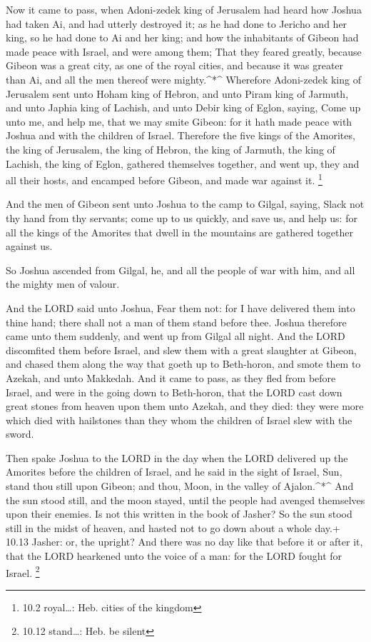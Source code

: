 Now it came to pass, when Adoni-zedek king of Jerusalem had
heard how Joshua had taken Ai, and had utterly destroyed it; as he had
done to Jericho and her king, so he had done to Ai and her king; and how
the inhabitants of Gibeon had made peace with Israel, and were among
them;  That they feared greatly, because Gibeon was a great
city, as one of the royal cities, and because it was greater than Ai,
and all the men thereof were mighty.\^{}*\^{}  Wherefore
Adoni-zedek king of Jerusalem sent unto Hoham king of Hebron, and unto
Piram king of Jarmuth, and unto Japhia king of Lachish, and unto Debir
king of Eglon, saying,  Come up unto me, and help me, that
we may smite Gibeon: for it hath made peace with Joshua and with the
children of Israel.  Therefore the five kings of the
Amorites, the king of Jerusalem, the king of Hebron, the king of
Jarmuth, the king of Lachish, the king of Eglon, gathered themselves
together, and went up, they and all their hosts, and encamped before
Gibeon, and made war against it. \footnote{10.2 royal\ldots: Heb. cities
  of the kingdom}

 And the men of Gibeon sent unto Joshua to the camp to
Gilgal, saying, Slack not thy hand from thy servants; come up to us
quickly, and save us, and help us: for all the kings of the Amorites
that dwell in the mountains are gathered together against us.

 So Joshua ascended from Gilgal, he, and all the people of
war with him, and all the mighty men of valour.

 And the LORD said unto Joshua, Fear them not: for I have
delivered them into thine hand; there shall not a man of them stand
before thee.  Joshua therefore came unto them suddenly, and
went up from Gilgal all night.  And the LORD discomfited
them before Israel, and slew them with a great slaughter at Gibeon, and
chased them along the way that goeth up to Beth-horon, and smote them to
Azekah, and unto Makkedah.  And it came to pass, as they
fled from before Israel, and were in the going down to Beth-horon, that
the LORD cast down great stones from heaven upon them unto Azekah, and
they died: they were more which died with hailstones than they whom the
children of Israel slew with the sword.

 Then spake Joshua to the LORD in the day when the LORD
delivered up the Amorites before the children of Israel, and he said in
the sight of Israel, Sun, stand thou still upon Gibeon; and thou, Moon,
in the valley of Ajalon.\^{}*\^{}  And the sun stood still,
and the moon stayed, until the people had avenged themselves upon their
enemies. Is not this written in the book of Jasher? So the sun stood
still in the midst of heaven, and hasted not to go down about a whole
day.+ 10.13 Jasher: or, the upright?  And there was no day
like that before it or after it, that the LORD hearkened unto the voice
of a man: for the LORD fought for Israel. \footnote{10.12 stand\ldots:
  Heb. be silent}

